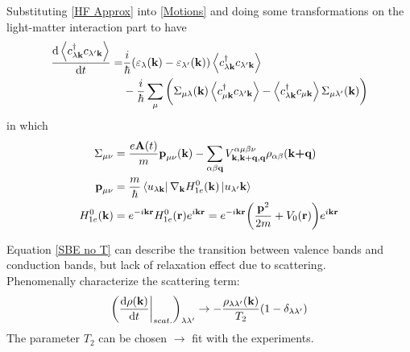 \documentclass{beamer}
\begin{document}
\begin{frame}
	Substituting \eqref{HF Approx} into \eqref{Motions} and doing some transformations on the light-matter interaction part to have
\begin{align}
\label{SBE no T}
\dv{\ev{c^{\dagger}_{\lambda\textbf{k}} c_{\lambda'\textbf{k}}}}{t} = &\frac{i}{\hbar} (\varepsilon_{\lambda}(\textbf{k}) - \varepsilon_{\lambda'}(\textbf{k}))\ev{c^{\dagger}_{\lambda\textbf{k}} c_{\lambda'\textbf{k}}}\nonumber\\
&-\frac{i}{\hbar} \sum_{\mu}\bigg(\Sigma_{\mu \lambda}(\textbf{k}) \ev{c^{\dagger}_{\mu\textbf{k}} c_{\lambda'\textbf{k}}} - \ev{c^{\dagger}_{\lambda\textbf{k}} c_{\mu\textbf{k}}} \Sigma_{\mu \lambda'}(\textbf{k})\bigg)
\end{align}
in which
\begin{align}
	\Sigma_{\mu\nu} &= \frac{e\textbf{A}(t)}{m}\textbf{p}_{\mu\nu}(\textbf{k}) - \sum_{\alpha\beta\textbf{q}} V^{\alpha \mu \beta \nu}_{\textbf{k},\textbf{k}+\textbf{q},\textbf{q}}\rho_{\alpha \beta}(\textbf{k+q})\\
	\textbf{p}_{\mu \nu} &= \frac{m}{\hbar}\bra{u_{\lambda \textbf{k}}}\nabla_{\textbf{k}}H^0_{1e}(\textbf{k})\ket{u_{\lambda'}\textbf{k}}\\
	H^0_{1e}(\textbf{k}) &= e^{-i\textbf{k}\textbf{r}} H^0_{1e}(\textbf{r})e^{i\textbf{k}\textbf{r}} = e^{-i\textbf{k}\textbf{r}} \bigg(\frac{\textbf{p}^2}{2m} +V_0(\textbf{r})\bigg)e^{i\textbf{k}\textbf{r}}
\end{align}
\end{frame}
\begin{frame}
Equation \eqref{SBE no T} can describe the transition between valence bands and conduction bands, but lack of relaxation effect due to scattering.\\\null
\quad Phenomenally characterize the scattering term:
\begin{equation}
	\bigg(\dv{\rho(\textbf{k})}{t}\bigg|_{scat.}\bigg)_{\lambda\lambda'} \to - \frac{\rho_{\lambda\lambda'}(\textbf{k})}{T_2}(1-\delta_{\lambda\lambda'})
\end{equation}
\quad The parameter \(T_2\) can be chosen $\to$ fit with the experiments.
\end{frame}
\end{document}
